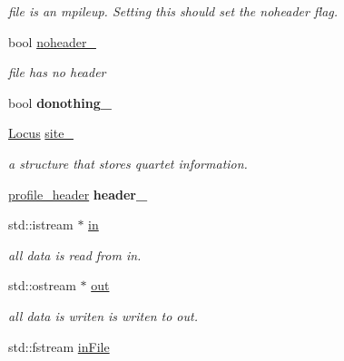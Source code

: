 \begin{DoxyCompactItemize}
\begin{DoxyCompactList}\small\item\em file is an mpileup. Setting this should set the noheader flag. \end{DoxyCompactList}\item 
\hypertarget{classprofile_a83d91045a7a49f0f30643e1b616d5fb5}{bool \hyperlink{classprofile_a83d91045a7a49f0f30643e1b616d5fb5}{noheader\-\_\-}}\label{classprofile_a83d91045a7a49f0f30643e1b616d5fb5}

\begin{DoxyCompactList}\small\item\em file has no header \end{DoxyCompactList}\item 
\hypertarget{classprofile_a427ff42061a39c70e303b866e8119878}{bool {\bfseries donothing\-\_\-}}\label{classprofile_a427ff42061a39c70e303b866e8119878}

\item 
\hypertarget{classprofile_aa6191769a6fc2de72b8a57a48b0f25aa}{\hyperlink{classLocus}{Locus} \hyperlink{classprofile_aa6191769a6fc2de72b8a57a48b0f25aa}{site\-\_\-}}\label{classprofile_aa6191769a6fc2de72b8a57a48b0f25aa}

\begin{DoxyCompactList}\small\item\em a structure that stores quartet information. \end{DoxyCompactList}\item 
\hypertarget{classprofile_a0f925c9f416deea0d8a28caf07b6cbee}{\hyperlink{classprofile__header}{profile\-\_\-header} {\bfseries header\-\_\-}}\label{classprofile_a0f925c9f416deea0d8a28caf07b6cbee}

\item 
\hypertarget{classprofile_a7346ac6024199f5f12f3fc5db0c607cd}{std\-::istream $\ast$ \hyperlink{classprofile_a7346ac6024199f5f12f3fc5db0c607cd}{in}}\label{classprofile_a7346ac6024199f5f12f3fc5db0c607cd}

\begin{DoxyCompactList}\small\item\em all data is read from in. \end{DoxyCompactList}\item 
\hypertarget{classprofile_a81d00689589d19f89c5598b0fa20ff22}{std\-::ostream $\ast$ \hyperlink{classprofile_a81d00689589d19f89c5598b0fa20ff22}{out}}\label{classprofile_a81d00689589d19f89c5598b0fa20ff22}

\begin{DoxyCompactList}\small\item\em all data is writen is writen to out. \end{DoxyCompactList}\item 
\hypertarget{classprofile_a8471c572d7df9d038b9c85d4c028bd99}{std\-::fstream \hyperlink{classprofile_a8471c572d7df9d038b9c85d4c028bd99}{in\-File}}\label{classprofile_a8471c572d7df9d038b9c85d4c028bd99}


\end{DoxyCompactItemize}
